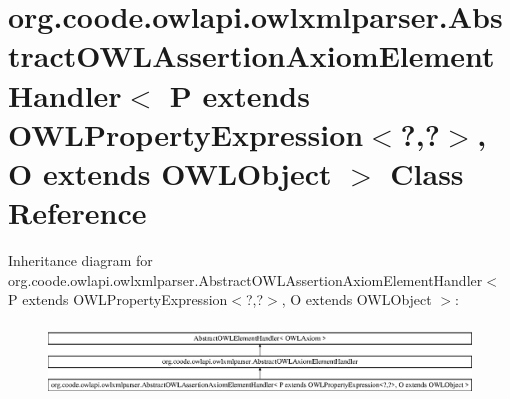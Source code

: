 \hypertarget{classorg_1_1coode_1_1owlapi_1_1owlxmlparser_1_1_abstract_o_w_l_assertion_axiom_element_handler_3400ddbb774fad720b1e593f64f8eec5c}{\section{org.\-coode.\-owlapi.\-owlxmlparser.\-Abstract\-O\-W\-L\-Assertion\-Axiom\-Element\-Handler$<$ P extends O\-W\-L\-Property\-Expression$<$?,?$>$, O extends O\-W\-L\-Object $>$ Class Reference}
\label{classorg_1_1coode_1_1owlapi_1_1owlxmlparser_1_1_abstract_o_w_l_assertion_axiom_element_handler_3400ddbb774fad720b1e593f64f8eec5c}
}
Inheritance diagram for org.\-coode.\-owlapi.\-owlxmlparser.\-Abstract\-O\-W\-L\-Assertion\-Axiom\-Element\-Handler$<$ P extends O\-W\-L\-Property\-Expression$<$?,?$>$, O extends O\-W\-L\-Object $>$\-:\begin{figure}[H]
\begin{center}
\leavevmode
\includegraphics[height=1.990521cm]{classorg_1_1coode_1_1owlapi_1_1owlxmlparser_1_1_abstract_o_w_l_assertion_axiom_element_handler_3400ddbb774fad720b1e593f64f8eec5c}
\end{center}
\end{figure}
